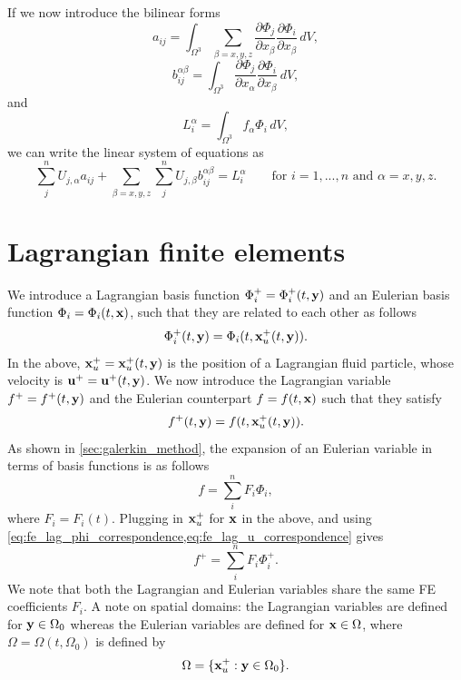 \documentclass[oneside,a4paper,11pt]{report}
\begin{document}
If we now introduce the bilinear forms 
\begin{equation}
    a_{ij} = \int_{\Omega^3} \sum_{\beta=x,y,z} \frac{\partial \Phi_j}{\partial x_\beta} \frac{\partial \Phi_i}{\partial x_\beta} \,dV,
\end{equation}
\begin{equation}
    b_{ij}^{\alpha \beta} = \int_{\Omega^3}\frac{\partial \Phi_j}{\partial x_\alpha} \frac{\partial \Phi_i}{\partial x_\beta} \, dV,
\end{equation}
and
\begin{equation}
    L_i^\alpha = \int_{\Omega^3} f_\alpha \Phi_i \,dV,
\end{equation}
we can write the linear system of equations as
\begin{equation}
    \sum_j^n U_{j,\alpha} a_{ij} + \sum_{\beta=x,y,z} \sum_j^n U_{j,\beta} b_{ij}^{\alpha \beta} = L_i^\alpha \qquad \text{for } i = 1,...,n \text{ and } \alpha = x,y,z.
\end{equation}

\section{Lagrangian finite elements}
We introduce a Lagrangian basis function $\Phi_i^+ = \Phi_i^+(t,\mathbf{y})$ and an Eulerian basis function $\Phi_i = \Phi_i(t,\mathbf{x})$, such that they are related to each other as follows
\begin{equation}
    \label{eq:fe_lag_phi_correspondence}
    \Phi_i^+(t,\mathbf{y}) = \Phi_i(t,\mathbf{x}_u^+(t,\mathbf{y})).
\end{equation}
In the above, $\mathbf{x}_u^+ = \mathbf{x}_u^+(t,\mathbf{y})$ is the position of a Lagrangian fluid particle, whose velocity is $\mathbf{u}^+ = \mathbf{u}^+(t,\mathbf{y})$. We now introduce the Lagrangian variable $f^+ = f^+(t,\mathbf{y})$ and the Eulerian counterpart $f = f(t,\mathbf{x})$ such that they satisfy
\begin{equation}
    \label{eq:fe_lag_u_correspondence}
    f^+(t,\mathbf{y}) = f(t,\mathbf{x}_u^+(t,\mathbf{y})).
\end{equation}
As shown in \cref{sec:galerkin_method}, the expansion of an Eulerian variable in terms of basis functions is as follows
\begin{equation}
    \label{eq:fe_lag_expansion_eul}
    f = \sum_i^n F_i \Phi_i,
\end{equation}
where $F_i = F_i(t)$. Plugging in $\mathbf{x}_u^+$ for $\mathbf{x}$ in the above, and using \cref{eq:fe_lag_phi_correspondence,eq:fe_lag_u_correspondence} gives
\begin{equation}
    \label{eq:fe_lag_expansion_lag}
    f^+ = \sum_i^n F_i \Phi_i^+.
\end{equation}
We note that both the Lagrangian and Eulerian variables share the same FE coefficients $F_i$. A note on spatial domains: the Lagrangian variables are defined for $\mathbf{y} \in \Omega_0$ whereas the Eulerian variables are defined for $\mathbf{x} \in \Omega$, where $\Omega=\Omega(t,\Omega_0)$ is defined by
\begin{equation}
    \Omega = \{ \mathbf{x}_u^+ : \mathbf{y} \in \Omega_0 \}.
\end{equation}
\end{document}
